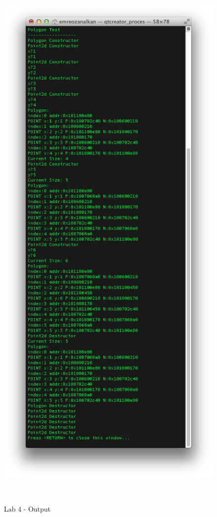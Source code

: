 \documentclass{article}
\begin{document}
\begin{figure}[ht!]
\centering
\includegraphics[height=280mm]{Output1.png}
\caption{Lab 4 - Output}
\end{figure}
\end{document}
